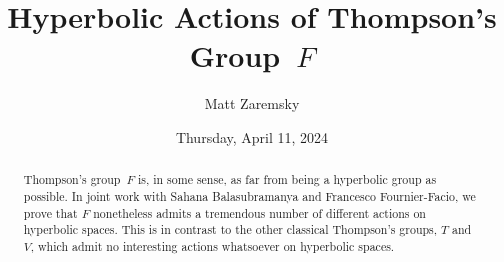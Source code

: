 \documentclass{UAmathtalk}
\author{Matt Zaremsky}
\title{Hyperbolic Actions of Thompson’s Group~$F$}
\date{Thursday, April 11, 2024}
\begin{document}
\maketitle

\begin{abstract}
Thompson’s group~$F$ is, in some sense, as far from being a hyperbolic group as possible. In joint work with Sahana Balasubramanya and Francesco Fournier-Facio, we prove that $F$ nonetheless admits a tremendous number of different actions on hyperbolic spaces. This is in contrast to the other classical Thompson’s groups, $T$ and~$V$, which admit no interesting actions whatsoever on hyperbolic spaces.
\end{abstract}
\end{document}
